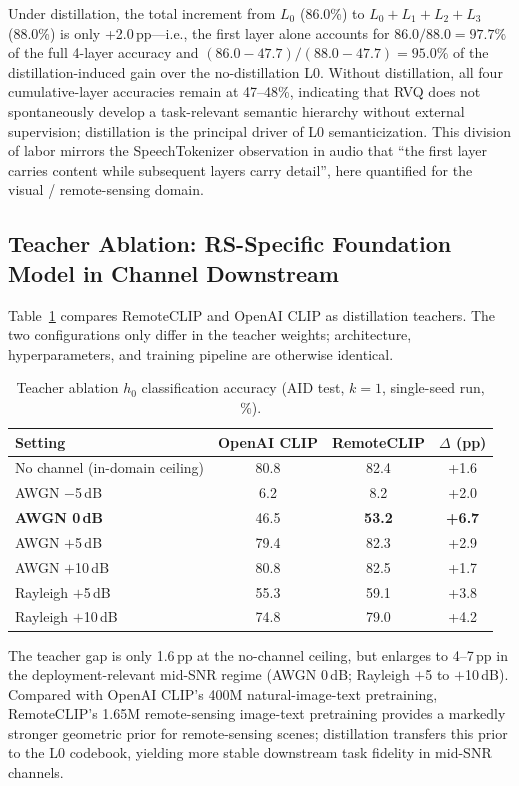 \documentclass[lettersize,journal]{IEEEtran}
\begin{document}
Under distillation, the total increment from $L_0$ (86.0\%) to $L_0\!+\!L_1\!+\!L_2\!+\!L_3$ (88.0\%) is only +2.0\,pp---i.e., the first layer alone accounts for $86.0/88.0=97.7\%$ of the full 4-layer accuracy and $(86.0-47.7)/(88.0-47.7)=95.0\%$ of the distillation-induced gain over the no-distillation L0. Without distillation, all four cumulative-layer accuracies remain at 47--48\%, indicating that RVQ does not spontaneously develop a task-relevant semantic hierarchy without external supervision; distillation is the principal driver of L0 semanticization. This division of labor mirrors the SpeechTokenizer observation in audio that ``the first layer carries content while subsequent layers carry detail'', here quantified for the visual / remote-sensing domain.

\subsection{Teacher Ablation: RS-Specific Foundation Model in Channel Downstream}
\label{sec:exp-teacher}

Table~\ref{tab:teacher} compares RemoteCLIP and OpenAI CLIP as distillation teachers. The two configurations only differ in the teacher weights; architecture, hyperparameters, and training pipeline are otherwise identical.

\begin{table}[!t]
\centering
\caption{Teacher ablation $h_0$ classification accuracy (AID test, $k{=}1$, single-seed run, \%).}
\label{tab:teacher}
\begin{tabular}{@{}lccc@{}}
\toprule
Setting & OpenAI CLIP & \textbf{RemoteCLIP} & $\Delta$ (pp) \\ \midrule
No channel (in-domain ceiling) & 80.8 & 82.4 & +1.6 \\
AWGN $-$5\,dB & 6.2 & 8.2 & +2.0 \\
\textbf{AWGN 0\,dB} & 46.5 & \textbf{53.2} & \textbf{+6.7} \\
AWGN $+$5\,dB & 79.4 & 82.3 & +2.9 \\
AWGN $+$10\,dB & 80.8 & 82.5 & +1.7 \\
Rayleigh $+$5\,dB & 55.3 & 59.1 & +3.8 \\
Rayleigh $+$10\,dB & 74.8 & 79.0 & +4.2 \\ \bottomrule
\end{tabular}
\end{table}

The teacher gap is only 1.6\,pp at the no-channel ceiling, but enlarges to 4--7\,pp in the deployment-relevant mid-SNR regime (AWGN 0\,dB; Rayleigh $+$5 to $+$10\,dB). Compared with OpenAI CLIP's 400M natural-image-text pretraining, RemoteCLIP's 1.65M remote-sensing image-text pretraining provides a markedly stronger geometric prior for remote-sensing scenes; distillation transfers this prior to the L0 codebook, yielding more stable downstream task fidelity in mid-SNR channels.
\end{document}
